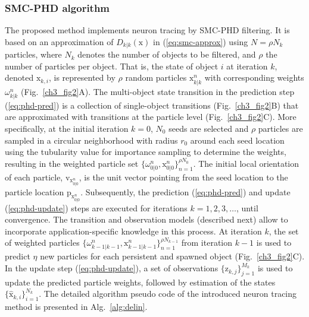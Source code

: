 \subsubsection{SMC-PHD algorithm}
\label{ssec:smc-phd-rec}
The proposed method implements neuron tracing by SMC-PHD filtering. It is based on an approximation of $D_{k|k}(\mathrm{x})$ in (\ref{eq:smc-approx}) using $N=\rho N_k$ particles, where $N_k$ denotes the number of objects to be filtered, and $\rho$ the number of particles per object. That is, the state of object $i$ at iteration $k$, denoted $\mathrm{x}_{k,i}$, is represented by $\rho$ random particles $\mathrm{x}_{k|k}^{n}$ with corresponding weights $\omega_{k|k}^{n}$ (Fig.~\ref{ch3_fig2}A). The multi-object state transition in the prediction step (\ref{eq:phd-pred}) is a collection of single-object transitions (Fig.~\ref{ch3_fig2}B) that are approximated with transitions at the particle level (Fig.~\ref{ch3_fig2}C). More specifically, at the initial iteration $k=0$, $N_0$ seeds are selected and $\rho$ particles are sampled in a circular neighborhood with radius $r_0$ around each seed location using the tubularity value for importance sampling to determine the weights, resulting in the weighted particle set $\lbrace \omega_{0|0}^n, \mathrm{x}_{0|0}^n \rbrace_{n=1}^{\rho N_0}$. The initial local orientation of each particle, $\mathrm{v}_{\mathrm{x}_{0|0}^n}$, is the unit vector pointing from the seed location to the particle location $\mathrm{p}_{\mathrm{x}_{0|0}^n}$. Subsequently, the prediction (\ref{eq:phd-pred}) and update (\ref{eq:phd-update}) steps are executed for iterations $k=1,2,3,\dots$, until convergence. The transition and observation models (described next) allow to incorporate application-specific knowledge in this process. At iteration $k$, the set of weighted particles $\lbrace \omega_{k-1|k-1}^n, \mathrm{x}_{k-1|k-1}^n \rbrace_{n=1}^{\rho N_{k-1}}$ from iteration $k-1$ is used to predict $\eta$ new particles for each persistent and spawned object (Fig.~\ref{ch3_fig2}C). In the update step (\ref{eq:phd-update}), a set of observations $\lbrace \mathrm{z}_{k,j}\rbrace_{j=1}^{M_k}$ is used to update the predicted particle weights, followed by estimation of the states $\lbrace \hat{\mathrm{x}}_{k,i}\rbrace_{i=1}^{N_k}$. The detailed algorithm pseudo code of the introduced neuron tracing method is presented in Alg.~\ref{alg:delin}.
